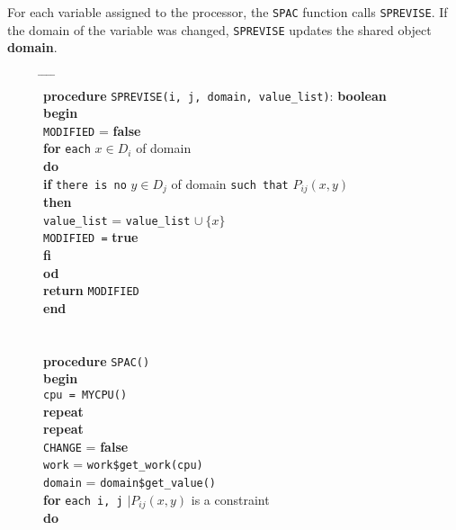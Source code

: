 \documentclass[a4paper,11pt]{article}
\begin{document}
For each variable assigned to
the processor, the {\tt SPAC} function calls {\tt SPREVISE}. If the
domain of the variable was changed, {\tt SPREVISE} updates the shared
object {\bf domain}.
\begin{figure}[htbp]
\begin{center}
\begin{tabbing}
\hspace{2cm} \= \hspace{0.5cm} \= \hspace{0.5cm} \= \hspace{0.5cm}
\= \hspace{0.5cm} \= \\
\> {\bf procedure} {\tt SPREVISE(i, j, domain, value\_list)}: {\bf boolean} \\
\> {\bf begin} \\
\> \> {\tt MODIFIED} = {\bf false} \\
\> \> {\bf for} {\tt each} $x \in D_i$ of domain \\
\> \> {\bf do} \\
\> \> \> {\bf if} {\tt there is no} $y \in D_j$ of domain
{\tt such that} $P_{ij}(x, y)$ \\
\> \> \> {\bf then} \\
\> \> \> \> {\tt value\_list} = {\tt value\_list} $ \cup\:\{x\}$ \\
\> \> \> \> {\tt MODIFIED =} {\bf true} \\
\> \> \> {\bf fi} \\
\> \> {\bf od} \\
\> \> {\bf return} {\tt MODIFIED} \\
\> {\bf end} \\
\\ \\ 
\> {\bf procedure} {\tt SPAC()} \\
\> {\bf begin} \\
\> \> {\tt cpu = MYCPU()} \\
\> \> {\bf repeat} \\
\> \> \> {\bf repeat} \\
\> \> \> \> {\tt CHANGE} = {\bf false} \\
\> \> \> \> {\tt work} = {\tt work\$get\_work(cpu)} \\
\> \> \> \> {\tt domain} = {\tt domain\$get\_value()} \\
\> \> \> \> {\bf for} {\tt each i, j} $\mid P_{ij}(x, y)$ is a constraint \\
\> \> \> \> {\bf do} \\

\end{tabbing}
\end{center}
\end{figure}
\end{document}
